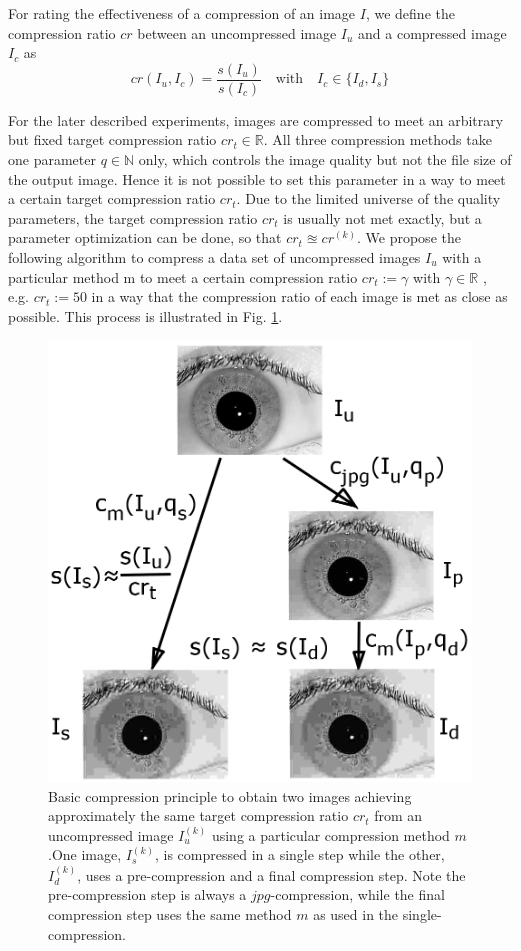 \documentclass[10pt,twocolumn,letterpaper]{article}
\begin{document}
For rating the effectiveness of a compression of an image $I$, we define the compression ratio $cr$ between an uncompressed image $I_u$ and a compressed image $I_c$ as 
\begin{equation}
cr(I_u, I_c) = \frac{s(I_u)}{s(I_c)} \quad \text{with} \quad I_c \in \{I_d, I_s\}
\end{equation}

For the later described experiments, images are compressed to meet an arbitrary but fixed target compression ratio $cr_t \in \mathbb{R}$. All three compression methods take one parameter $q \in \mathbb{N}$ only, which controls the image quality but not the file size of the output image. Hence it is not possible to set this parameter in a way to meet a certain target compression ratio $cr_t$. Due to the limited universe of the quality parameters, the target compression ratio $cr_t$ is usually not met exactly, but a parameter optimization can be done, so that $cr_t \approxeq cr^{(k)}$. We propose the following algorithm to compress a data set of uncompressed images $I_u$ with a particular method m to meet a certain compression ratio $cr_t := \gamma$ with $\gamma \in \mathbb{R}$ , e.g. $cr_t := 50$ in a way that the compression ratio of each image is met as close as possible. This process is illustrated in Fig. \ref{fig:comprScheme}.

\begin{figure}[h]
	\begin{center}
		
	\includegraphics[width=0.7\linewidth]{img/comprScheme}
\end{center}
	\caption{Basic compression principle to obtain two images achieving approximately the same target compression ratio $cr_t$ from an uncompressed image $I_u^{(k)}$ using a particular compression method $m$.One image, $I_s^{(k)}$, is compressed in a single step while the other, $I_d^{(k)}$, uses a pre-compression and a final compression step. Note the pre-compression step is always a $jpg$-compression, while the final compression step uses the same method $m$ as used in the single-compression.}
	\label{fig:comprScheme}
	
\end{figure}
\end{document}
